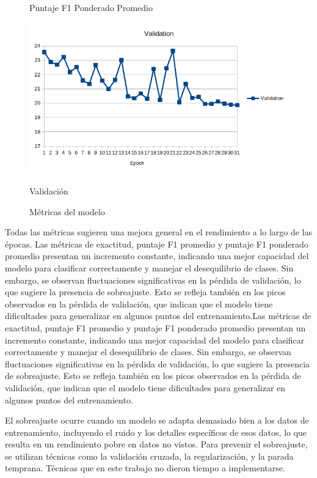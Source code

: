 \begin{figure}[htbp]
\begin{minipage}[b]{0.495\textwidth}
        \caption{Puntaje F1 Ponderado Promedio}
        \label{fig:avgweightedf1}
    \end{minipage}
    \hfill
    \begin{minipage}[b]{0.495\textwidth}
        \centering
        \includegraphics[width=\textwidth]{images/Validationtable.png}
        \caption{Validación}
        \label{fig:validation}
    \end{minipage}
    \caption{Métricas del modelo}
    \label{fig:grid}
\end{figure}


Todas las métricas sugieren una mejora general en el rendimiento a lo largo de las épocas. Las métricas de exactitud, puntaje F1 promedio y puntaje F1 ponderado promedio presentan un incremento constante, indicando una mejor capacidad del modelo para clasificar correctamente y manejar el desequilibrio de clases. Sin embargo, se observan fluctuaciones significativas en la pérdida de validación, lo que sugiere la presencia de sobreajuste. Esto se refleja también en los picos observados en la pérdida de validación, que indican que el modelo tiene dificultades para generalizar en algunos puntos del entrenamiento.Las métricas de exactitud, puntaje F1 promedio y puntaje F1 ponderado promedio presentan un incremento constante, indicando una mejor capacidad del modelo para clasificar correctamente y manejar el desequilibrio de clases. Sin embargo, se observan fluctuaciones significativas en la pérdida de validación, lo que sugiere la presencia de sobreajuste. Esto se refleja también en los picos observados en la pérdida de validación, que indican que el modelo tiene dificultades para generalizar en algunos puntos del entrenamiento.

El sobreajuste ocurre cuando un modelo se adapta demasiado bien a los datos de entrenamiento, incluyendo el ruido y los detalles específicos de esos datos, lo que resulta en un rendimiento pobre en datos no vistos. Para prevenir el sobreajuste, se utilizan técnicas como la validación cruzada, la regularización, y la parada temprana. Técnicas que en este trabajo no dieron tiempo a implementarse.

